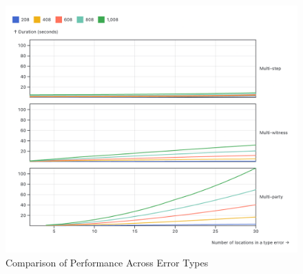 \documentclass[pdflatex,sn-mathphys-num]{sn-jnl}%
\begin{document}
\begin{figure}[ht]
    \centering
    \includegraphics[width=\linewidth]{images/compare-time.png}
    \caption{Comparison of Performance Across Error Types}
    \label{fig:compare-time}
\end{figure}


    
\end{document}
